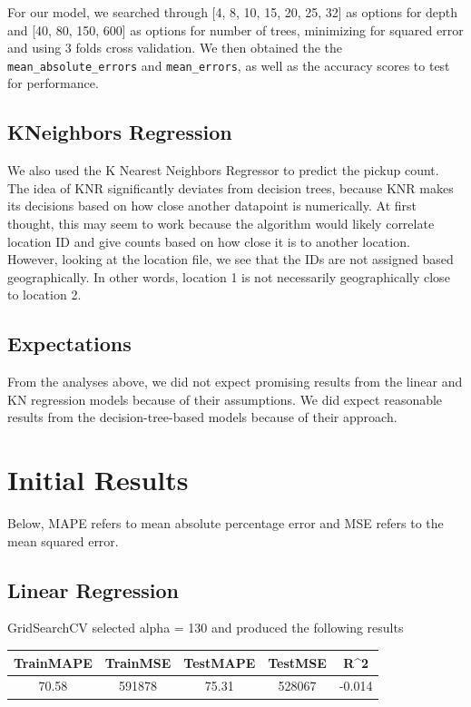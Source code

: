 \documentclass[journal]{IEEEtran}
\newcommand{\cc}[1]{\texttt{#1}}
\begin{document}
\noindent For our model, we searched through [4, 8, 10, 15, 20, 25, 32] as options for depth and [40, 80, 150, 600] as options for number of trees, minimizing for squared error and using 3 folds cross validation. We then obtained the the \cc{mean\_absolute\_errors} and \cc{mean\squared\_errors}, as well as the accuracy scores to test for performance. 

\subsection{KNeighbors Regression}

\noindent We also used the K Nearest Neighbors Regressor to predict the pickup count. The idea of KNR significantly deviates from decision trees, because KNR makes its decisions based on how close another datapoint is numerically. At first thought, this may seem to work because the algorithm would likely correlate location ID and give counts based on how close it is to another location. However, looking at the location file, we see that the IDs are not assigned based geographically. In other words, location 1 is not necessarily geographically close to location 2. 

\subsection{Expectations}

\noindent From the analyses above, we did not expect promising results from the linear and KN regression models because of their assumptions. We did expect reasonable results from the decision-tree-based models because of their approach. 

\section{Initial Results}

\noindent Below, MAPE refers to mean absolute percentage error and MSE refers to the mean squared error.

\subsection{Linear Regression}

\noindent GridSearchCV selected alpha = 130 and produced the following results\\

\begingroup
    \medskip
    \centering
    \def\arraystretch{1.5}
        \begin{tabular}{ccccc}
            \toprule
            TrainMAPE & TrainMSE & TestMAPE & TestMSE & R^2 \\
            \midrule
            70.58 & 591878 & 75.31 & 528067 & -0.014\\
            \bottomrule
        \end{tabular}
    \label{table:}
    \medskip
\endgroup
\end{document}
